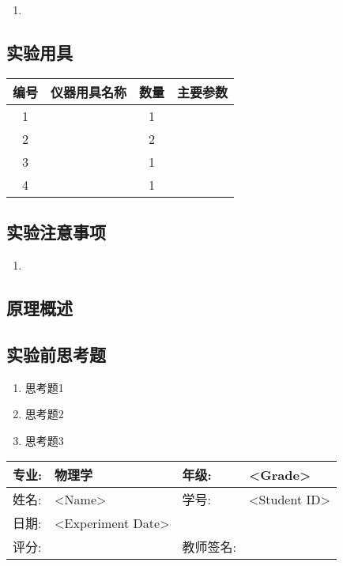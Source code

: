 \documentclass{ctexart}
\newcommand{\student}{<Name>}
\newcommand{\Grade}{<Grade>}
\newcommand{\stuID}{<Student ID>}
\newcommand{\experimentdate}{<Experiment Date>}
\numberwithin{equation}{section}%
\theoremstyle{ansstyle}
\newcommand{\experimentdata}{%
    \begin{center}
        \begin{tabular}{|p{2cm}|p{4cm}|p{4cm}|p{4cm}|}
            \hline
            专业:  & 物理学 & 年级:  & \Grade \\
            \hline
            姓名:  & \student & 学号:  & \stuID \\
            \hline
            日期:  & \experimentdate & & \\
            \hline
            评分:  &   & 教师签名: & \\
            \hline
        \end{tabular}
    \end{center}%
}
\begin{document}
\begin{enumerate}
    \item 
\end{enumerate}

\subsection{实验用具}
\begin{table}[H]
\begin{center}
    \begin{tabular}{|c|c|c|p{8cm}|}%
        \hline
        编号 & 仪器用具名称 & 数量 & 主要参数 \\
        \hline
        1 &  & 1 &  \\ %
        \hline
        2 &  & 2 &  \\
        \hline
        3  &   & 1 &  \\
        \hline
        4  &   & 1 &  \\
        \hline
    \end{tabular}
\end{center}
\end{table}

\subsection{实验注意事项}

\begin{enumerate}
    \item 
\end{enumerate}

\subsection{原理概述}


\subsection{实验前思考题}
\begin{enumerate}
    \item 思考题1
    \item 思考题2
    \item 思考题3
\end{enumerate}

\newpage

\experimentdata

\end{document}

